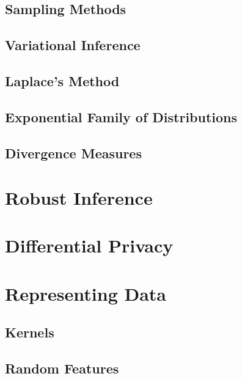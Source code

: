 \subsection{Sampling Methods}
\label{subsec:b-sampling-methods}

\subsection{Variational Inference}
\label{subsec:b-variational-inference}

\subsection{Laplace's Method}
\label{subsec:b-laplace-method}

\subsection{Exponential Family of Distributions}
\label{subsec:b-expfam}

\subsection{Divergence Measures}
\label{subsec:b-divergences}

\section{Robust Inference}
\label{sec:b-robust-inference}

\section{Differential Privacy}
\label{sec:b-differential-privacy}

\section{Representing Data}
\label{sec:b-representing-data}

\subsection{Kernels}
\label{subsec:b-kernels}

\subsection{Random Features}
\label{subsec:b-random-features}






